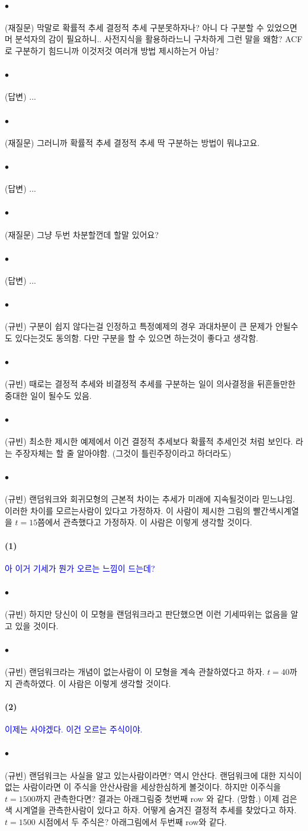 \documentclass[12pt,oneside,english]{book}
\def\ck{\paragraph{\Large$\bullet$}\Large}
\def\one{\paragraph{\Large(1)}\Large}
\def\two{\paragraph{\Large(2)}\Large}
\begin{document}
\ck (재질문) 막말로 확률적 추세 결정적 추세 구분못하자나? 아니 다 구분할 수 있었으면 머 분석자의 감이 필요하니.. 사전지식을 활용하라느니 구차하게 그런 말을 왜함? ACF로 구분하기 힘드니까 이것저것 여러개 방법 제시하는거 아님? 

\ck (답변) ... 

\ck (재질문) 그러니까 확률적 추세 결정적 추세 딱 구분하는 방법이 뭐냐고요. 

\ck (답변) ... 

\ck (재질문) 그냥 두번 차분할껀데 할말 있어요? 

\ck (답변) ... 

\ck (규빈) 구분이 쉽지 않다는걸 인정하고 특정예제의 경우 과대차분이 큰 문제가 안될수도 있다는것도 동의함. 다만 구분을 할 수 있으면 하는것이 좋다고 생각함. 

\ck (규빈) 때로는 결정적 추세와 비결정적 추세를 구분하는 일이 의사결정을 뒤흔들만한 중대한 일이 될수도 있음. 

\ck (규빈) 최소한 제시한 예제에서 이건 결정적 추세보다 확률적 추세인것 처럼 보인다. 라는 주장자체는 할 줄 알아야함. (그것이 틀린주장이라고 하더라도)

\ck (규빈) 랜덤워크와 회귀모형의 근본적 차이는 추세가 미래에 지속될것이라 믿느냐임. 이러한 차이를 모르는사람이 있다고 가정하자. 이 사람이 제시한 그림의 빨간색시계열을 $t=15$쯤에서 관측했다고 가정하자. 이 사람은 이렇게 생각할 것이다. 

\one \textcolor{blue}{아 이거 기세가 뭔가 오르는 느낌이 드는데?}

\ck (규빈) 하지만 당신이 이 모형을 랜덤워크라고 판단했으면 이런 기세따위는 없음을 알고 있을 것이다. 

\ck (규빈) 랜덤워크라는 개념이 없는사람이 이 모형을 계속 관찰하였다고 하자. $t=40$까지 관측하였다. 이 사람은 이렇게 생각할 것이다. 

\two \textcolor{blue}{이제는 사야겠다. 이건 오르는 주식이야.}

\ck (규빈) 랜덤워크는 사실을 알고 있는사람이라면? 역시 안산다. 랜덤워크에 대한 지식이 없는 사람이라면 이 주식을 안산사람을 세상한심하게 볼것이다. 하지만 이주식을 $t=1500$까지 관측한다면? 결과는 아래그림중 첫번째 row 와 같다. (망함.) 이제 검은색 시계열을 관측한사람이 있다고 하자. 어떻게 숨겨진 결정적 추세를 찾았다고 하자. $t=1500$ 시점에서 두 주식은? 아래그림에서 두번째 row와 같다. 
\end{document}
